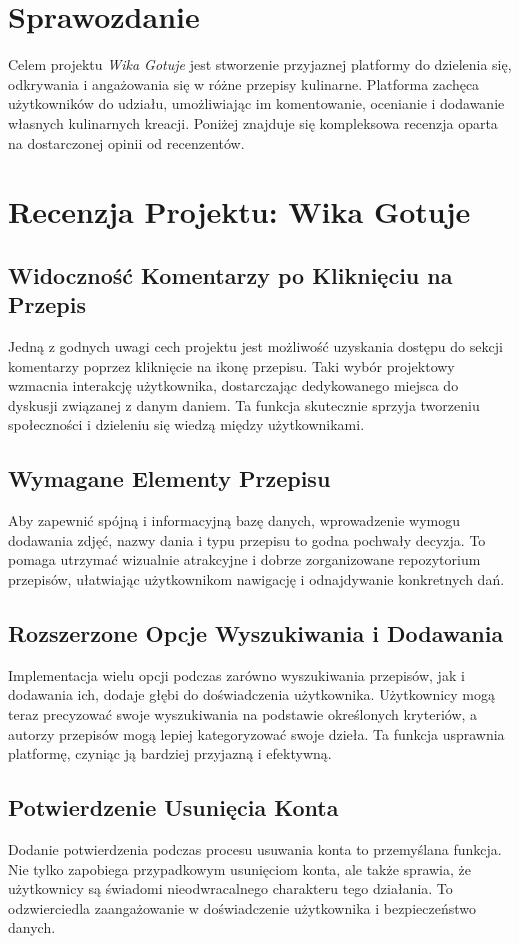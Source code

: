 \documentclass{article}
\begin{document}
\section{Sprawozdanie}
Celem projektu \textit{Wika Gotuje} jest stworzenie przyjaznej platformy do dzielenia się, odkrywania i angażowania się w różne przepisy kulinarne. Platforma zachęca użytkowników do udziału, umożliwiając im komentowanie, ocenianie i dodawanie własnych kulinarnych kreacji. Poniżej znajduje się kompleksowa recenzja oparta na dostarczonej opinii od recenzentów.

\section{Recenzja Projektu: Wika Gotuje}
\subsection{Widoczność Komentarzy po Kliknięciu na Przepis}
    Jedną z godnych uwagi cech projektu jest możliwość uzyskania dostępu do sekcji komentarzy poprzez kliknięcie na ikonę przepisu. Taki wybór projektowy wzmacnia interakcję użytkownika, dostarczając dedykowanego miejsca do dyskusji związanej z danym daniem. Ta funkcja skutecznie sprzyja tworzeniu społeczności i dzieleniu się wiedzą między użytkownikami.
\subsection{Wymagane Elementy Przepisu}
  Aby zapewnić spójną i informacyjną bazę danych, wprowadzenie wymogu dodawania zdjęć, nazwy dania i typu przepisu to godna pochwały decyzja. To pomaga utrzymać wizualnie atrakcyjne i dobrze zorganizowane repozytorium przepisów, ułatwiając użytkownikom nawigację i odnajdywanie konkretnych dań.
\subsection{Rozszerzone Opcje Wyszukiwania i Dodawania}
  Implementacja wielu opcji podczas zarówno wyszukiwania przepisów, jak i dodawania ich, dodaje głębi do doświadczenia użytkownika. Użytkownicy mogą teraz precyzować swoje wyszukiwania na podstawie określonych kryteriów, a autorzy przepisów mogą lepiej kategoryzować swoje dzieła. Ta funkcja usprawnia platformę, czyniąc ją bardziej przyjazną i efektywną.
\subsection{Potwierdzenie Usunięcia Konta}
    Dodanie potwierdzenia podczas procesu usuwania konta to przemyślana funkcja. Nie tylko zapobiega przypadkowym usunięciom konta, ale także sprawia, że użytkownicy są świadomi nieodwracalnego charakteru tego działania. To odzwierciedla zaangażowanie w doświadczenie użytkownika i bezpieczeństwo danych.
\end{document}
